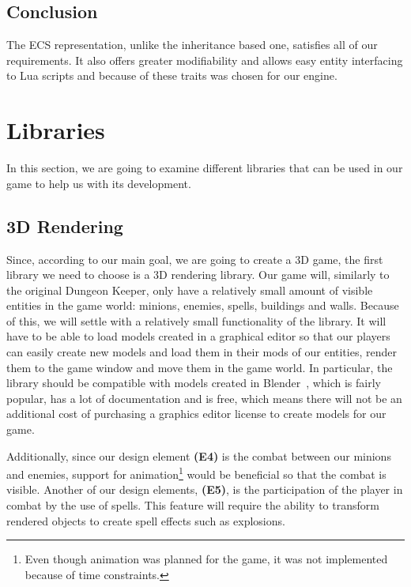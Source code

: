 \subsection{Conclusion}

The ECS representation, unlike the inheritance based one,  satisfies all of our requirements. It also offers greater modifiability and
allows easy entity interfacing to Lua scripts and because of these traits was chosen for our engine.

\section{Libraries}

In this section, we are going to examine different libraries that can be used in our game
to help us with its development.

\subsection{3D Rendering}

Since, according to our main goal, we are going to create a 3D game, the first library we need to choose is a 3D rendering library.
Our game will, similarly to the original Dungeon Keeper, only have a relatively small amount of visible entities in the game world: 
minions, enemies, spells, buildings and walls. Because of this, we will settle with a relatively small functionality of the library.
It will have to be able to load models created in a graphical editor so that our players can easily create new models and load them
in their mods  of our entities, render them to the game window and move them in the game world. In particular, the library should be
compatible with models created in Blender~\cite{Blender}, which is fairly popular, has a lot of documentation and is free, which means
there will not be an additional cost of purchasing a graphics editor license to create models for our game.

Additionally, since our design element \textbf{(E4)} is the combat between our minions and enemies, support for
animation\footnote{Even though animation was planned for the game, it was not implemented because of time constraints.} would be
beneficial so that the combat is visible. Another of our design elements, \textbf{(E5)}, is the participation of the player in combat
by the use of spells. This feature will require the ability to transform rendered objects to create spell effects such as explosions.

